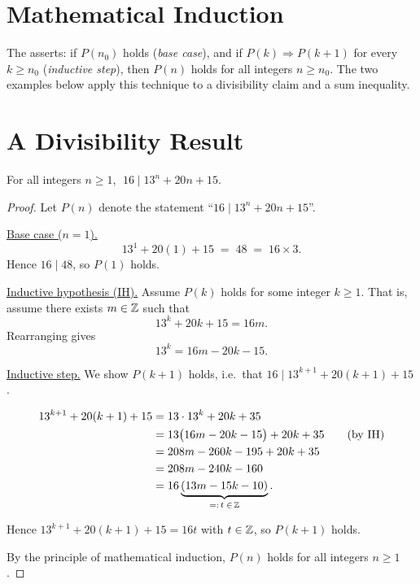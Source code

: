 \section{Mathematical Induction}

The  asserts: if $P(n_0)$ holds
(\emph{base case}), and if $P(k) \Rightarrow P(k+1)$ for every $k \geq n_0$
(\emph{inductive step}), then $P(n)$ holds for all integers $n \geq n_0$.
The two examples below apply this technique to a divisibility claim and a sum
inequality.

\section{A Divisibility Result}

\begin{theorem}
For all integers $n \geq 1$, $\;16 \mid 13^n + 20n + 15$.
\end{theorem}

\begin{proof}
Let $P(n)$ denote the statement ``$16 \mid 13^n + 20n + 15$''.

\bigskip
\noindent\underline{Base case ($n = 1$).}
\[
    13^1 + 20(1) + 15 \;=\; 48 \;=\; 16 \times 3.
\]
Hence $16 \mid 48$, so $P(1)$ holds.

\bigskip
\noindent\underline{Inductive hypothesis (IH).}
Assume $P(k)$ holds for some integer $k \geq 1$. That is, assume there exists
$m \in \mathbb{Z}$ such that
\[
    13^k + 20k + 15 = 16m.
\]
Rearranging gives
\[
    13^k = 16m - 20k - 15. \tag{IH}
\]

\bigskip
\noindent\underline{Inductive step.}
We show $P(k+1)$ holds, i.e.\ that $16 \mid 13^{k+1} + 20(k+1) + 15$.

\begin{align*}
    13^{k+1} + 20(k+1) + 15
    &= 13 \cdot 13^k + 20k + 35 \\
    &= 13\bigl(16m - 20k - 15\bigr) + 20k + 35
        \tag{by IH} \\
    &= 208m - 260k - 195 + 20k + 35 \\
    &= 208m - 240k - 160 \\
    &= 16\underbrace{(13m - 15k - 10)}_{=:\,t\;\in\,\mathbb{Z}}.
\end{align*}

Hence $13^{k+1} + 20(k+1) + 15 = 16t$ with $t \in \mathbb{Z}$, so $P(k+1)$ holds.

\bigskip
By the principle of mathematical induction, $P(n)$ holds for all integers
$n \geq 1$.
\end{proof}

